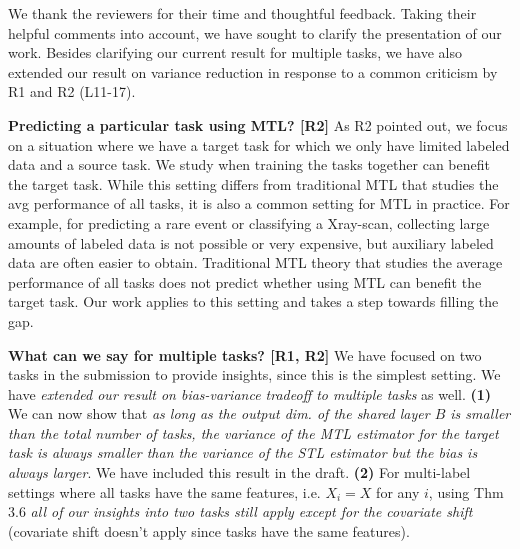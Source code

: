 \documentclass{article}
\begin{document}
We thank the reviewers for their time and thoughtful feedback.
Taking their helpful comments into account, we have sought to clarify the presentation of our work. %
Besides clarifying our current result for multiple tasks, we have also extended our result on variance reduction in response to a common criticism by R1 and R2 (L11-17).


\vspace{-0.02in}
\textbf{Predicting a particular task using MTL? [R2]}
As R2 pointed out, we focus on a situation where we have a target task for which we only have limited labeled data and a source task.
We study when training the tasks together can benefit the target task.
While this setting differs from traditional MTL that studies the avg performance of all tasks, it is also a common setting for MTL in practice.
For example, for predicting a rare event or classifying a Xray-scan, collecting large amounts of labeled data is not possible or very expensive, but auxiliary labeled data are often easier to obtain.
Traditional MTL theory that studies the average performance of all tasks does not predict whether using MTL can benefit the target task.
Our work applies to this setting and takes a step towards filling the gap.


\vspace{-0.025in}
\textbf{What can we say for multiple tasks? [R1, R2]}
We have focused on two tasks in the submission to provide insights, since this is the simplest setting.
We have \textit{extended our result on bias-variance tradeoff to multiple tasks} as well.
\textbf{(1)} We can now show that \textit{as long as the output dim. of the shared layer $B$ is smaller than the total number of tasks, the variance of the MTL estimator for the target task is always smaller than the variance of the STL estimator but the bias is always larger}.
We have included this result in the draft.
\textbf{(2)} For multi-label settings where all tasks have the same features, i.e. $X_i = X$ for any $i$, using Thm 3.6 \textit{all of our insights into two tasks still apply except for the covariate shift} (covariate shift doesn't apply since tasks have the same features).
\end{document}
